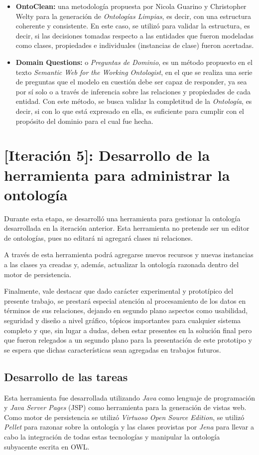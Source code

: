 \begin{itemize}
\begin{itemize}
    \item \textbf{OntoClean:} una metodología propuesta por Nicola Guarino y Christopher Welty para la generación de \textit{Ontologías Limpias}, es decir, con una estructura coherente y consistente. En este caso, se utilizó para validar la estructura, es decir, si las decisiones tomadas respecto a las entidades que fueron modeladas como clases, propiedades e individuales (instancias de clase) fueron acertadas.
    \item \textbf{Domain Questions:} o \textit{Preguntas de Dominio}, es un método propuesto en el texto \textit{Semantic Web for the Working Ontologist}, en el que se realiza una serie de preguntas que el modelo en cuestión debe ser capaz de responder, ya sea por sí solo o a través de inferencia sobre las relaciones y propiedades de cada entidad. Con este método, se busca validar la completitud de la \textit{Ontología}, es decir, si con lo que está expresado en ella, es suficiente para cumplir con el propósito del dominio para el cual fue hecha.
\end{itemize}

\section{[Iteración 5]: Desarrollo de la herramienta para administrar la ontología}
Durante esta etapa, se desarrolló una herramienta para gestionar la ontología desarrollada en la iteración anterior. Esta herramienta no pretende ser un editor de ontologías, pues no editará ni agregará clases ni relaciones.

A través de esta herramienta podrá agregarse nuevos recursos y nuevas instancias a las clases ya creadas y, además, actualizar la ontología razonada dentro del motor de persistencia. 

Finalmente, vale destacar que dado carácter experimental y prototípico del presente trabajo, se prestará especial atención al procesamiento de los datos en términos de sus relaciones, dejando en segundo plano aspectos como usabilidad, seguridad y diseño a nivel gráfico, tópicos importantes para cualquier sistema completo y que, sin lugar a dudas, deben estar presentes en la solución final pero que fueron relegados a un segundo plano para la presentación de este prototipo y se espera que dichas características sean agregadas en trabajos futuros.

\subsection{Desarrollo de las tareas}
Esta herramienta fue desarrollada utilizando \textit{Java} como lenguaje de programación y \textit{Java Server Pages} (JSP) como herramienta para la generación de vistas web. Como motor de persistencia se utilizó \textit{Virtuoso Open Source Edition}, se utilizó \textit{Pellet} para razonar sobre la ontología y las clases provistas por \textit{Jena} para llevar a cabo la integración de todas estas tecnologías y manipular la ontología subyacente escrita en OWL.


\end{itemize}
